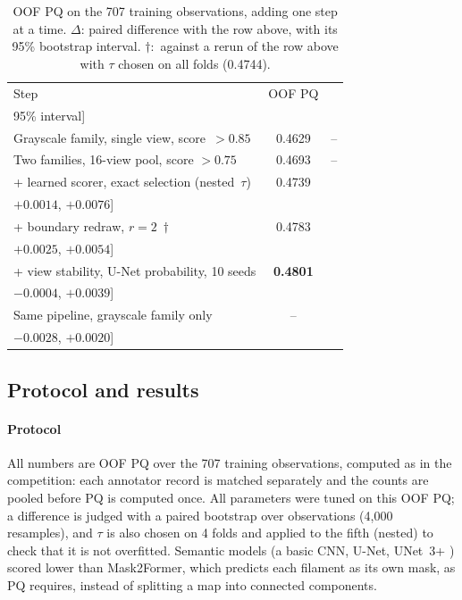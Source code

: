 \documentclass[sigconf]{acmart}
\begin{document}
\section{\texorpdfstring{}{Evaluation}}\label{sec:evaluation}

\begin{table}[t]
\centering
\small
\caption{OOF PQ on the 707 training observations, adding one step at a time. $\Delta$: paired difference with the row above, with its 95\% bootstrap interval. $\dagger$:~against a rerun of the row above with $\tau$ chosen on all folds (0.4744).}
\label{tab:results}
\newcommand*{\twoline}[2]{\begin{tabular}{@{}c@{}}#1\\ #2\end{tabular}}
\renewcommand{\tabularxcolumn}[1]{m{#1}}
\setlength{\tabcolsep}{4pt}
\begin{tabularx}{\columnwidth}{@{}>{\raggedright\arraybackslash}Xcc@{}}
\toprule
Step & OOF PQ & \twoline{$\Delta$}{{[}95\% interval{]}} \\
\midrule
Grayscale family, single view, score~$>0.85$ & 0.4629 & -- \\
Two families, 16-view pool, score $>0.75$ & 0.4693 & -- \\
+ learned scorer, exact selection (nested~$\tau$) & 0.4739 & \textbf{\boldmath\twoline{$+0.0046$}{{[}$+0.0014$, $+0.0076${]}}} \\
+ boundary redraw, $r=2$~$\dagger$ & 0.4783 & \twoline{$+0.0039$}{{[}$+0.0025$, $+0.0054${]}} \\
+ view stability, U-Net probability, 10 seeds & \textbf{0.4801} & \twoline{$+0.0018$}{{[}$-0.0004$, $+0.0039${]}} \\
\midrule
Same pipeline, grayscale family only & -- & \twoline{$-0.0004$}{{[}$-0.0028$, $+0.0020${]}} \\
\bottomrule
\end{tabularx}
\end{table}

\subsection{Protocol and results}
\paragraph{\textbf{Protocol}} All numbers are OOF PQ over the 707 training observations, computed as in the competition: each annotator record is matched separately and the counts are pooled before PQ is computed once. All parameters were tuned on this OOF PQ; a difference is judged with a paired bootstrap over observations (4,000 resamples), and $\tau$ is also chosen on 4 folds and applied to the fifth (nested) to check that it is not overfitted. Semantic models (a basic CNN, U-Net, UNet~3+ \cite{huang2020unet3plus}) scored lower than Mask2Former, which predicts each filament as its own mask, as PQ requires, instead of splitting a map into connected components.
\end{document}

